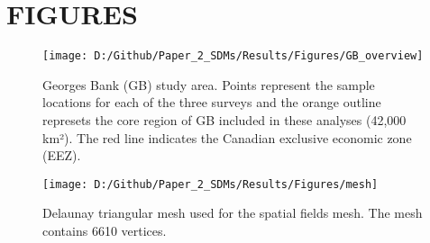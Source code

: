 \documentclass[
]{article}
\begin{document}
\hypertarget{ref-figs}{%
\section{FIGURES}\label{ref-figs}}

\begin{figure}[htb]

{\centering \texttt{[image: D:/Github/Paper\_2\_SDMs/Results/Figures/GB\_overview]} 

}

\caption{Georges Bank (GB) study area.  Points represent the sample locations for each of the three surveys and the orange outline represets the core region of GB included in these analyses (42,000 km²).  The red line indicates the Canadian exclusive economic zone (EEZ).}\label{fig:Overview}
\end{figure}

\clearpage
\begin{figure}[htb]

{\centering \texttt{[image: D:/Github/Paper\_2\_SDMs/Results/Figures/mesh]} 

}

\caption{Delaunay triangular mesh used for the spatial fields mesh. The mesh contains 6610 vertices.}\label{fig:Mesh}
\end{figure}
\end{document}
